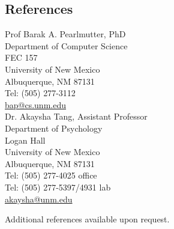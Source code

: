 \documentclass[10pt,overlapped,line]{res}
\begin{document}
\begin{resume}
\section{References}
 \begin{multicols}{2}
{\small
   Prof Barak A. Pearlmutter, PhD \\
   Department of Computer Science \\
   FEC 157 \\
   University of New Mexico \\
   Albuquerque, NM  87131 \\
   Tel: (505) 277-3112  \\
   \href{URL}{bap@cs.unm.edu} \\

   Dr. Akaysha Tang, Assistant Professor\\
   Department of Psychology \\
   Logan Hall \\
   University of New Mexico \\
   Albuquerque, NM 87131 \\
   Tel: (505) 277-4025 office \\
   Tel: (505) 277-5397/4931 lab \\
   \href{URL}{akaysha@unm.edu} \\
}
\end{multicols}

Additional references available upon request.



\end{resume}
\end{document}
